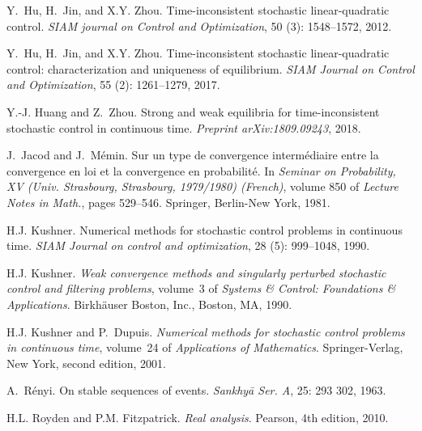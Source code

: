 \documentclass[12pt]{article}
\theoremstyle{named}
\numberwithin{equation}{section}
\begin{document}
\begin{thebibliography}{31}
Y.~Hu, H.~Jin, and X.Y. Zhou.
\newblock Time-inconsistent stochastic linear-quadratic control.
\newblock \emph{SIAM journal on Control and Optimization}, 50
  (3): 1548--1572, 2012.

Y.~Hu, H.~Jin, and X.Y. Zhou.
\newblock Time-inconsistent stochastic linear-quadratic control:
  characterization and uniqueness of equilibrium.
\newblock \emph{SIAM Journal on Control and Optimization}, 55
  (2): 1261--1279, 2017.

Y.-J. Huang and Z.~Zhou.
\newblock Strong and weak equilibria for time-inconsistent stochastic control
  in continuous time.
\newblock \emph{Preprint arXiv:1809.09243}, 2018.

J.~Jacod and J.~M\'{e}min.
\newblock Sur un type de convergence interm\'{e}diaire entre la convergence en
  loi et la convergence en probabilit\'{e}.
\newblock In \emph{Seminar on {P}robability, {XV} ({U}niv. {S}trasbourg,
  {S}trasbourg, 1979/1980) ({F}rench)}, volume 850 of \emph{Lecture Notes in
  Math.}, pages 529--546. Springer, Berlin-New York, 1981.

H.J. Kushner.
\newblock Numerical methods for stochastic control problems in continuous time.
\newblock \emph{SIAM Journal on control and optimization}, 28
  (5): 999--1048, 1990{}.

H.J. Kushner.
\newblock \emph{Weak convergence methods and singularly perturbed stochastic
  control and filtering problems}, volume~3 of \emph{Systems \& Control:
  Foundations \& Applications}.
\newblock Birkh{\"{a}}user Boston, Inc., Boston, MA, 1990{}.

H.J. Kushner and P.~Dupuis.
\newblock \emph{Numerical methods for stochastic control problems in continuous
  time}, volume~24 of \emph{Applications of Mathematics}.
\newblock Springer-Verlag, New York, second edition, 2001.

A.~R\'{e}nyi.
\newblock On stable sequences of events.
\newblock \emph{Sankhy\={a} Ser. A}, 25: 293 302, 1963.

H.L. Royden and P.M. Fitzpatrick.
\newblock \emph{Real analysis}.
\newblock Pearson, 4th edition, 2010.


\end{thebibliography}
\end{document}

